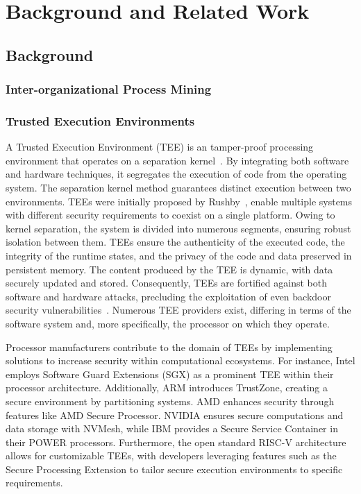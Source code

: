 \section{Background and Related Work}
\begin{newj}
\subsection{Background}
\label{sec:background}
\subsubsection{Inter-organizational Process Mining}



\subsubsection{Trusted Execution Environments}
\label{sec:background:tee}
A Trusted Execution Environment (TEE) is an tamper-proof processing environment that operates on a separation kernel~\citep{mcgillion2015open}. By integrating both software and hardware techniques, it segregates the execution of code from the operating system. The separation kernel method guarantees distinct execution between two environments.
TEEs were initially proposed by Rushby~\citet{rushby1981design}, enable multiple systems with different security requirements to coexist on a single platform. Owing to kernel separation, the system is divided into numerous segments, ensuring robust isolation between them.
TEEs ensure the authenticity of the executed code, the integrity of the runtime states, and the privacy of the code and data preserved in persistent memory. The content produced by the TEE is dynamic, with data securely updated and stored. Consequently, TEEs are fortified against both software and hardware attacks, precluding the exploitation of even backdoor security vulnerabilities~\citep{DBLP:conf/trustcom/SabtAB15}. Numerous TEE providers exist, differing in terms of the software system and, more specifically, the processor on which they operate.

Processor manufacturers contribute to the domain of TEEs by implementing solutions to increase security within computational ecosystems. For instance, Intel employs Software Guard Extensions (SGX) as a prominent TEE within their processor architecture. Additionally, ARM introduces TrustZone, creating a secure environment by partitioning systems. AMD enhances security through features like AMD Secure Processor. NVIDIA ensures secure computations and data storage with NVMesh, while IBM provides a Secure Service Container in their POWER processors. Furthermore, the open standard RISC-V architecture allows for customizable TEEs, with developers leveraging features such as the Secure Processing Extension to tailor secure execution environments to specific requirements.


\end{newj}
